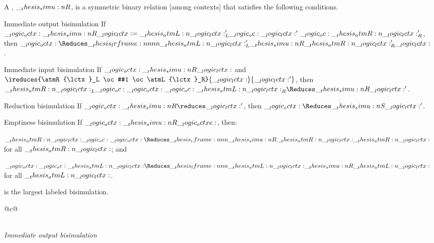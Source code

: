 \begin{definition}
  A , $\__thesis_simu:n {R}$, is a symmetric binary relation [among contexts] that satisfies the following conditions.
  \begin{thmdescription}
  \item[Immediate output bisimulation]
    If $\__logic_octx: \__thesis_simu:n {R} \__logic_lctx: = \__thesis_atmL:n {\__logic_lctx:}'_L \__logic_oc: \__logic_lctx:' \__logic_oc: \__thesis_atmR:n {\__logic_lctx:}'_R$, then $\octx \Reduces\lrframe{\atmL{\lctx}'_L}{\simu{R}}{\atmR{\lctx}'_R} \lctx$.
  \item[Immediate input bisimulation]
    If $\__logic_octx: \__thesis_simu:n {R} \__logic_lctx:$ and $\ireduces{\atmR{\lctx}_L \oc #1 \oc \atmL{\lctx}_R}{\lctx}{\lctx'}$, then $\atmR{\lctx}_L \oc \octx \oc \atmL{\lctx}_R \Reduces\simu{R} \lctx'$.
  \item[Reduction bisimulation]
    If $\octx \simu{R}\reduces \lctx'$, then $\octx \Reduces\simu{S} \lctx'$.
  \item[Emptiness bisimulation]
    If $\__logic_octx: \__thesis_simu:n {R} \__logic_octxe:$, then:
    \begin{itemize*}[label=, afterlabel=]
    \item $\atmR{\lctx} \oc \octx \Reduces\rframe{\simu{R}}{\atmR{\lctx}} \atmR{\lctx}$ for all $\__thesis_atmR:n {\__logic_lctx:}$; and
    \item $\octx \oc \atmL{\lctx} \Reduces\lframe{\atmL{\lctx}}{\simu{R}} \atmL{\lctx}$ for all $\__thesis_atmL:n {\__logic_lctx:}$.
    \end{itemize*}
  \end{thmdescription}
   is the largest labeled bisimulation.
  \begin{marginfigure}
    \begin{center}
      \begin{tabular}{@{}c@{}}
        \\
        \emph{Immediate output bisimulation}
        \\
        \begin{tikzcd}[sep=large]

\end{tikzcd}
\end{tabular}
\end{center}
\end{marginfigure}
\end{definition}
